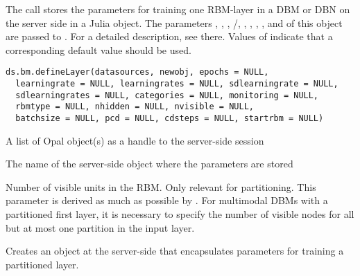 %
\begin{Description}\relax
The call stores the parameters for training one RBM-layer in a DBM or DBN
on the server side in a Julia  object.
The parameters , , ,
/, ,
, , ,  and 
of this object are passed to .
For a detailed description, see there.
Values of  indicate that a corresponding default value should be used.
\end{Description}
%
\begin{Usage}
\begin{verbatim}
ds.bm.defineLayer(datasources, newobj, epochs = NULL,
  learningrate = NULL, learningrates = NULL, sdlearningrate = NULL,
  sdlearningrates = NULL, categories = NULL, monitoring = NULL,
  rbmtype = NULL, nhidden = NULL, nvisible = NULL,
  batchsize = NULL, pcd = NULL, cdsteps = NULL, startrbm = NULL)
\end{verbatim}
\end{Usage}
%
\begin{Arguments}
\begin{ldescription}
\item[\code{datasources}] A list of Opal object(s) as a handle to the server-side session

\item[\code{newobj}] The name of the server-side object where the parameters are stored

\item[\code{nvisible}] Number of visible units in the RBM. Only relevant for partitioning.
This parameter is derived as much as possible by .
For multimodal DBMs with a partitioned first layer, it is necessary to specify
the number of visible nodes for all but at most one partition in the input layer.
\end{ldescription}
\end{Arguments}
%
\begin{Description}\relax
Creates an object at the server-side that encapsulates parameters for training
a partitioned layer.
\end{Description}
